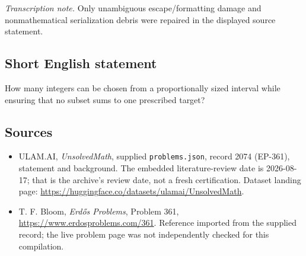 \documentclass[11pt,a4paper]{article}
\begin{document}
{\small\emph{Transcription note.} Only unambiguous escape/formatting damage and nonmathematical serialization debris were repaired in the displayed source statement.}

\subsection{Short English statement}

How many integers can be chosen from a proportionally sized interval while ensuring that no subset sums to one prescribed target?

\subsection{Sources}

{\small

\begin{itemize}

\item[\hypertarget{source:2074:1}{S1}] ULAM.AI, \emph{UnsolvedMath}, supplied \texttt{problems.json}, record 2074 (EP-361), statement and background. The embedded literature-review date is 2026-08-17; that is the archive’s review date, not a fresh certification. Dataset landing page: \url{https://huggingface.co/datasets/ulamai/UnsolvedMath}.

\item[\hypertarget{source:2074:2}{S2}] T. F. Bloom, \emph{Erdős Problems}, Problem 361, \url{https://www.erdosproblems.com/361}. Reference imported from the supplied record; the live problem page was not independently checked for this compilation.

\end{itemize}

}

\label{end:2074}
\end{document}

